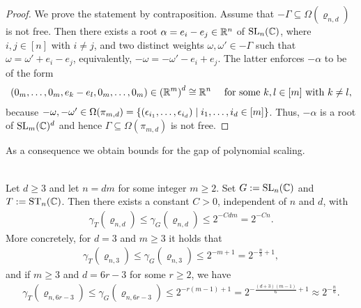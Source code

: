 \begin{proof}
	We prove the statement by contraposition. Assume that $-\Gamma \subseteq \Omega(\varrho_{n,d})$ is not free. Then there exists a root $\alpha = e_i - e_j \in \mathbb R^n$ of $\operatorname{SL}_n(\mathbb C)$, where $i,j \in [n]$ with $i \neq j$, and two distinct weights $\omega, \omega' \in -\Gamma$ such that $\omega = \omega' + e_i - e_j$, equivalently, $-\omega = -\omega' - e_i + e_j$. The latter enforces $- \alpha$ to be of the form
	\begin{align*}
		( 0_m, \ldots, 0_m, e_k - e_l, 0_m, \ldots, 0_m ) \in \left( \mathbb R^m \right)^d \cong \mathbb R^n
		\quad \text{ for some }  k,l \in [m] \text{ with } k \neq l,
	\end{align*}
	because $-\omega, -\omega' \in \Omega(\pi_{m,d}) = \{ (\epsilon_{i_1}, \ldots, \epsilon_{i_d}) \mid i_1,\ldots,i_d \in [m] \}$. Thus, $-\alpha$ is a root of $\operatorname{SL}_m(\mathbb C)^d$ and hence $\Gamma \subseteq \Omega(\pi_{m,d})$ is not free.
\end{proof}

As a consequence we obtain bounds for the gap of polynomial scaling.

\begin{theorem}\label{thm:dFormsGap}
	\ \\
	Let $d \geq 3$ and let $n = dm$ for some integer $m \geq 2$. Set $G := \operatorname{SL}_n(\mathbb C)$ and $T:= \operatorname{ST}_n(\mathbb C)$. Then there exists a constant $C > 0$, independent of $n$ and $d$, with
	\begin{align*}
		\gamma_{T}(\varrho_{n,d}) \leq \gamma_{G}(\varrho_{n,d}) \leq 2^{-C d m} = 2^{-Cn}.
	\end{align*}
	More concretely, for $d=3$ and $m \geq 3$ it holds that
	\begin{align*}
		\gamma_{T}(\varrho_{n,3}) \leq \gamma_{G}(\varrho_{n,3}) \leq 2^{-m + 1} = 2^{-\frac{n}{3} + 1},
	\end{align*}
	and if $m \geq 3$ and $d = 6r-3$ for some $r \geq 2$, we have
	\begin{align*}
		\gamma_{T}(\varrho_{n,6r-3}) \leq \gamma_{G}(\varrho_{n,6r-3})
		\leq 2^{- r (m-1) + 1} = 2^{- \frac{(d+3)(m-1)}{6} + 1} \approx 2^{- \frac{n}{6}}.
	\end{align*}
\end{theorem}

